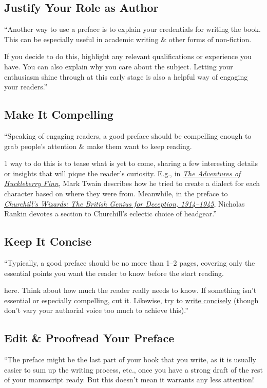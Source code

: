 \documentclass[oneside]{book}
\numberwithin{equation}{section}
\begin{document}
\subsection{Justify Your Role as Author}
``Another way to use a preface is to explain your credentials for writing the book. This can be especially useful in academic writing \& other forms of non-fiction.

If you decide to do this, highlight any relevant qualifications or experience you have. You can also explain why you care about the subject. Letting your enthusiasm shine through at this early stage is also a helpful way of engaging your readers.''

\subsection{Make It Compelling}
``Speaking of engaging readers, a good preface should be compelling enough to grab people's attention \& make them want to keep reading.

1 way to do this is to tease what is yet to come, sharing a few interesting details or insights that will pique the reader's curiosity. E.g., in \href{https://www.britannica.com/topic/Adventures-of-Huckleberry-Finn-novel-by-Twain}{\textit{The Adventures of Huckleberry Finn}}, Mark Twain describes how he tried to create a dialect for each character based on where they were from. Meanwhile, in the preface to \href{https://www.amazon.co.uk/dp/B002RI90B8/ref=dp-kindle-redirect?_encoding=UTF8&btkr=1}{\textit{Churchill's Wizards: The British Genius for Deception, 1914--1945}}, Nicholas Rankin devotes a section to Churchill's eclectic choice of headgear.''

\subsection{Keep It Concise}
``Typically, a good preface should be no more than 1--2 pages, covering only the essential points you want the reader to know before the start reading.

 here. Think about how much the reader really needs to know. If something isn't essential or especially compelling, cut it. Likewise, try to \href{https://proofed.co.uk/writing-tips/how-to-write-concisely/}{write concisely} (though don't vary your authorial voice too much to achieve this).''

\subsection{Edit \& Proofread Your Preface}
``The preface might be the last part of your book that you write, as it is usually easier to sum up the writing process, etc., once you have a strong draft of the rest of your manuscript ready. But this doesn't mean it warrants any less attention!
\end{document}
